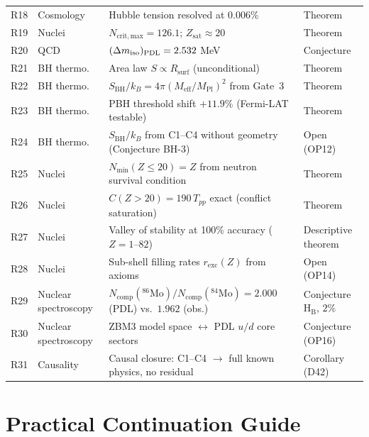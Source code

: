 \documentclass[11pt,a4paper]{article}
\theoremstyle{plain}
\theoremstyle{definition}
\theoremstyle{remark}
\newcommand{\PDL}{\textnormal{PDL}}
\newcommand{\Rsurf}{R_{\mathrm{surf}}}
\newcommand{\SBH}{S_{\mathrm{BH}}}
\newcommand{\Meff}{M_{\mathrm{eff}}}
\newcommand{\MPl}{M_{\mathrm{Pl}}}
\newcommand{\Tpp}{T_{pp}}
\newcommand{\Nmin}{N_{\min}}
\begin{document}
\begin{longtable}{@{}L{0.7cm}L{2.5cm}L{6.5cm}L{2.5cm}@{}}
R18 & Cosmology & Hubble tension resolved at $0.006\%$ & \textcolor{proofblue}{Theorem} \\[0.3em]
R19 & Nuclei & $N_{\mathrm{crit,max}}=126.1$; $Z_{\mathrm{sat}}\approx 20$ & \textcolor{proofblue}{Theorem} \\[0.3em]
R20 & QCD & $(\Delta m_{\mathrm{iso}})_{\PDL}=2.532$ MeV & \textcolor{conjecturegreen}{Conjecture} \\[0.3em]
R21 & BH thermo. & Area law $S\propto\Rsurf$ (unconditional) & \textcolor{proofblue}{Theorem} \\[0.3em]
R22 & BH thermo. & $\SBH/k_B=4\pi(\Meff/\MPl)^2$ from Gate~3 & \textcolor{proofblue}{Theorem} \\[0.3em]
R23 & BH thermo. & PBH threshold shift $+11.9\%$ (Fermi-LAT testable) & \textcolor{proofblue}{Theorem} \\[0.3em]
R24 & BH thermo. & $\SBH/k_B$ from C1--C4 without geometry (Conjecture BH-3) & \textcolor{openproblemred}{Open (OP12)} \\[0.3em]
R25 & Nuclei & $\Nmin(Z\leq20)=Z$ from neutron survival condition & \textcolor{proofblue}{Theorem} \\[0.3em]
R26 & Nuclei & $C(Z>20)=190\,\Tpp$ exact (conflict saturation) & \textcolor{proofblue}{Theorem} \\[0.3em]
R27 & Nuclei & Valley of stability at 100\% accuracy ($Z=1$--$82$) & \textcolor{proofblue}{Descriptive theorem} \\[0.3em]
R28 & Nuclei & Sub-shell filling rates $r_{\mathrm{exc}}(Z)$ from axioms & \textcolor{openproblemred}{Open (OP14)} \\[0.3em]
R29 & Nuclear spectroscopy & $N_{\mathrm{comp}}(^{86}\text{Mo})/N_{\mathrm{comp}}(^{84}\text{Mo}) = 2.000$ (PDL) vs.\ $1.962$ (obs.) & \textcolor{conjecturegreen}{Conjecture H$_\mathrm{B}$, $2\%$} \\[0.3em]
R30 & Nuclear spectroscopy & ZBM3 model space $\leftrightarrow$ PDL $u/d$ core sectors & \textcolor{conjecturegreen}{Conjecture (OP16)} \\[0.3em]
R31 & Causality & Causal closure: C1--C4 $\to$ full known physics, no residual & \textcolor{proofblue}{Corollary (D42)} \\[0.3em]

\end{longtable}

\section{Practical Continuation Guide}
\label{sec:continuation}
\end{document}
